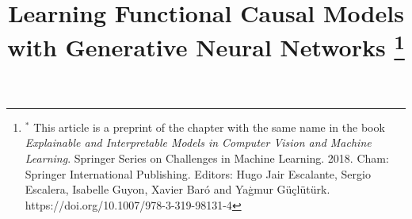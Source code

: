 \documentclass[a4paper, 11pt]{article}
\begin{document}
\title{Learning Functional Causal Models with Generative Neural Networks \thanks{$^*$ This article is a preprint of the chapter with the same name in the book \textit{Explainable and Interpretable Models in Computer Vision and Machine Learning}. Springer Series on Challenges in Machine Learning. 2018. Cham: Springer International Publishing. Editors: Hugo Jair Escalante, Sergio Escalera, Isabelle Guyon, Xavier Bar\'o and Ya\c{g}mur G{\"u}{\c{c}}l{\"u}t{\"u}rk. https://doi.org/10.1007/978-3-319-98131-4}}





\end{document}
